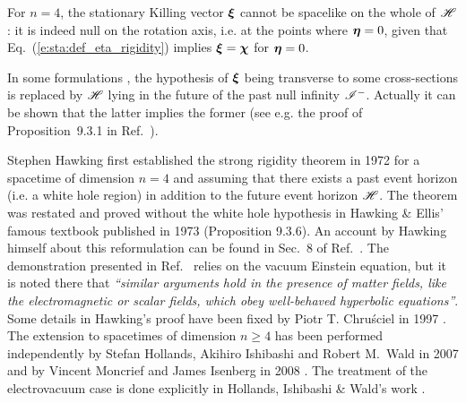 \begin{remark}
For $n=4$, the stationary Killing vector $\bm{\xi}$ cannot be spacelike
on the whole of $\mathscr{H}$: it is indeed null on the rotation axis, i.e.
at the points where $\bm{\eta} = 0$, given that Eq.~(\ref{e:sta:def_eta_rigidity})
implies $\bm{\xi} = \bm{\chi}$ for $\bm{\eta}=0$.
\end{remark}

\begin{remark}
In some formulations \cite{HollaIW07,HawkiE73}, the hypothesis of $\bm{\xi}$
being transverse to some cross-sections is replaced by $\mathscr{H}$ lying in
the future of the past null infinity $\mathscr{I}^-$. Actually it can be shown
that the latter implies the former (see e.g. the proof of Proposition~9.3.1
in Ref.~\cite{HawkiE73}).
\end{remark}

\begin{hist}
Stephen Hawking first established the strong rigidity
theorem in 1972 \cite{Hawki72}
for a spacetime of dimension $n=4$ and assuming that there exists
a past event horizon (i.e. a white hole region) in addition to the
future event horizon $\mathscr{H}$.
The theorem was restated and proved without the white hole hypothesis
in Hawking \& Ellis' famous textbook published in 1973 \cite{HawkiE73}
(Proposition 9.3.6).
An account by Hawking himself
about this reformulation can be found in
Sec.~8 of Ref.~\cite{Hawki73}. The demonstration presented in Ref.~\cite{HawkiE73}
relies on the vacuum Einstein equation,
but it is noted there that \emph{``similar arguments hold in the presence
of matter fields, like the electromagnetic or scalar fields, which obey
well-behaved hyperbolic equations''}.
Some details in Hawking's proof have been fixed
by Piotr T. Chru\'sciel in 1997 \cite{Chrus97}.
The extension to spacetimes of
dimension $n\geq 4$ has been performed independently by
Stefan Hollands, Akihiro Ishibashi
and Robert M.~Wald in 2007 \cite{HollaIW07}
and by Vincent Moncrief and James Isenberg
in 2008 \cite{MoncrI08}. The treatment of the electrovacuum
case is done explicitly in Hollands, Ishibashi \& Wald's work \cite{HollaIW07}.
\end{hist}

